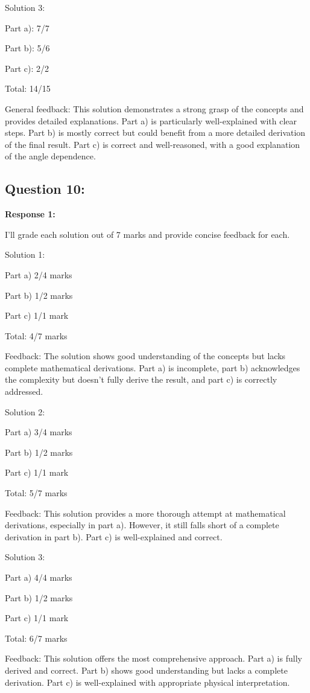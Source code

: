 \documentclass[a4paper,11pt]{article}
\begin{document}
Solution 3:

Part a): 7/7

Part b): 5/6

Part c): 2/2

Total: 14/15

General feedback: This solution demonstrates a strong grasp of the concepts and provides detailed explanations. Part a) is particularly well-explained with clear steps. Part b) is mostly correct but could benefit from a more detailed derivation of the final result. Part c) is correct and well-reasoned, with a good explanation of the angle dependence.

\subsection*{Question 10:}

\textbf{Response 1:}

I'll grade each solution out of 7 marks and provide concise feedback for each.

Solution 1:

Part a) 2/4 marks

Part b) 1/2 marks

Part c) 1/1 mark

Total: 4/7 marks

Feedback: The solution shows good understanding of the concepts but lacks complete mathematical derivations. Part a) is incomplete, part b) acknowledges the complexity but doesn't fully derive the result, and part c) is correctly addressed.

Solution 2:

Part a) 3/4 marks

Part b) 1/2 marks

Part c) 1/1 mark

Total: 5/7 marks

Feedback: This solution provides a more thorough attempt at mathematical derivations, especially in part a). However, it still falls short of a complete derivation in part b). Part c) is well-explained and correct.

Solution 3:

Part a) 4/4 marks

Part b) 1/2 marks

Part c) 1/1 mark

Total: 6/7 marks

Feedback: This solution offers the most comprehensive approach. Part a) is fully derived and correct. Part b) shows good understanding but lacks a complete derivation. Part c) is well-explained with appropriate physical interpretation.
\end{document}
